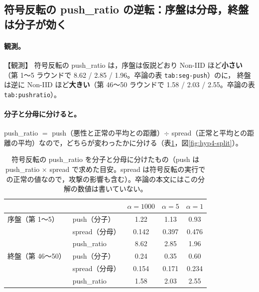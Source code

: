 \documentclass[a4j, dvipdfmx]{jsarticle}  %
\begin{document}
\subsection{符号反転の push\_ratio の逆転：序盤は分母，終盤は分子が効く}
\label{sec:claim-hyp4-reversal}

\paragraph{観測。}【観測】
符号反転の push\_ratio は，序盤は仮説どおり Non-IID ほど\textbf{小さい}（第 1〜5 ラウンドで 8.62 / 2.85 / 1.96。卒論の表 \texttt{tab:seg-push}）のに，
終盤は逆に Non-IID ほど\textbf{大きい}（第 46〜50 ラウンドで 1.58 / 2.03 / 2.55。卒論の表 \texttt{tab:pushratio}）。

\paragraph{分子と分母に分けると。}
push\_ratio $=$ push（悪性と正常の平均との距離）$\div$ spread（正常と平均との距離の平均）なので，どちらが変わったかに分ける（表\ref{tab:hyp4-split}，図\ref{fig:hyp4-split}）。

\begin{table}[H]
\centering
\caption{符号反転の push\_ratio を分子と分母に分けたもの（push は push\_ratio $\times$ spread で求めた目安。spread は符号反転の実行での正常の値なので，攻撃の影響も含む）。卒論の本文にはこの分解の数値は書いていない。}
\label{tab:hyp4-split}
\small
\begin{tabular}{@{}llccc@{}}
\toprule
 & & $\alpha = 1000$ & $\alpha = 5$ & $\alpha = 1$ \\
\midrule
序盤（第 1〜5） & push（分子） & 1.22 & 1.13 & 0.93 \\
 & spread（分母） & 0.142 & 0.397 & 0.476 \\
 & push\_ratio & 8.62 & 2.85 & 1.96 \\
\midrule
終盤（第 46〜50） & push（分子） & 0.24 & 0.35 & 0.60 \\
 & spread（分母） & 0.154 & 0.171 & 0.234 \\
 & push\_ratio & 1.58 & 2.03 & 2.55 \\
\bottomrule
\end{tabular}
\end{table}
\end{document}
